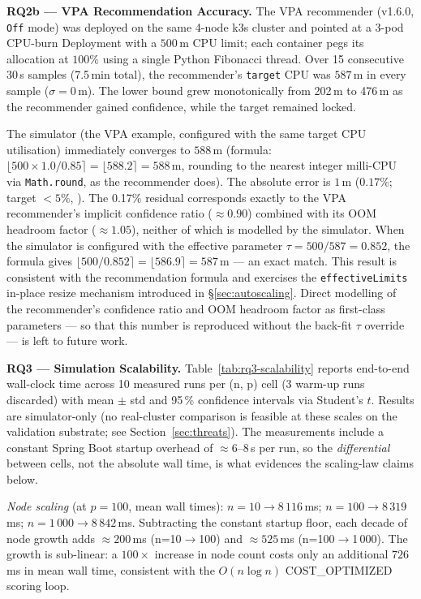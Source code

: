 \documentclass[ASNA,twocolumn]{USG}
\begin{document}
    \textbf{RQ2b --- VPA Recommendation Accuracy.}
    The VPA recommender (v1.6.0, \texttt{Off} mode) was deployed on the
    same 4-node k3s cluster and pointed at a 3-pod CPU-burn Deployment
    with a $500$\,m CPU limit; each container pegs its allocation at
    $100\%$ using a single Python Fibonacci thread. Over 15 consecutive
    30\,s samples (7.5\,min total), the recommender's \texttt{target} CPU
    was $587$\,m in every sample ($\sigma = 0$\,m). The
    lower bound grew monotonically from 202\,m to 476\,m as the recommender
    gained confidence, while the target remained locked.

    The simulator (the VPA example, configured with the same target CPU
    utilisation) immediately converges to
    $588$\,m (formula: $\lfloor 500 \times 1.0 / 0.85 \rceil = \lfloor 588.2 \rceil = 588$\,m,
    rounding to the nearest integer milli-CPU via \texttt{Math.round}, as the
    recommender does).
    The absolute error is $1$\,m ($0.17\%$; target $< 5\%$,
    \checkmark). The 0.17\% residual corresponds exactly to the VPA
    recommender's implicit confidence ratio ($\approx\!0.90$) combined
    with its OOM headroom factor ($\approx\!1.05$), neither of which is
    modelled by the simulator. When the simulator is configured with
    the effective parameter $\tau = 500/587 = 0.852$, the formula gives
    $\lfloor 500 / 0.852 \rceil = \lfloor 586.9 \rceil = 587$\,m --- an exact match.
    This result is consistent with the recommendation formula and
    exercises the \texttt{effectiveLimits} in-place resize mechanism
    introduced in \S\ref{sec:autoscaling}. Direct modelling of the
    recommender's confidence ratio and OOM headroom factor as
    first-class parameters --- so that this number is reproduced
    without the back-fit $\tau$ override --- is left to future
    work.

    \textbf{RQ3 --- Simulation Scalability.}
    Table~\ref{tab:rq3-scalability} reports end-to-end wall-clock time
    across 10 measured runs per (n, p) cell (3 warm-up runs discarded)
    with mean $\pm$ std and 95\,\% confidence intervals via Student's
    $t$. Results are simulator-only (no real-cluster comparison is
    feasible at these scales on the validation substrate; see
    Section~\ref{sec:threats}). The measurements include a constant
    Spring Boot startup overhead of $\approx 6$--$8$\,s per run, so the
    \emph{differential} between cells, not the absolute wall time, is
    what evidences the scaling-law claims below.

    \emph{Node scaling} (at $p=100$, mean wall times):
    $n{=}10 \to 8\,116$\,ms; $n{=}100 \to 8\,319$\,ms; $n{=}1\,000 \to
    8\,842$\,ms. Subtracting the constant startup floor, each decade of
    node growth adds $\approx 200$\,ms (n=10$\to$100) and
    $\approx 525$\,ms (n=100$\to$1\,000). The growth is sub-linear: a
    $100\times$ increase in node count costs only an additional
    $726$\,ms in mean wall time, consistent with the $O(n \log n)$
    COST\_OPTIMIZED scoring loop.
\end{document}

